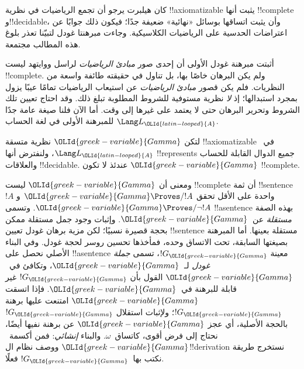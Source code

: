 \documentclass[../../../include/open-logic-section]{subfiles}
\begin{document}


كان هيلبرت يرجو أن تجمع الرياضيات في نظرية
!!{axiomatizable} يثبت أنها !!{complete} و!!{decidable}،
وأن يثبت اتساقها بوسائل «نهائية» ضعيفة جدًا؛ فيكون
ذلك جوابًا عن اعتراضات الحدسية على الرياضيات
الكلاسيكية. وجاءت مبرهنتا غودل لتبيّنا تعذر بلوغ
هذه المطالب مجتمعة.

أثبتت مبرهنة غودل الأولى أن إحدى صور
\emph{مبادئ الرياضيات} لراسل ووايتهد ليست
!!{complete}. ولم يكن البرهان خاصًا بها، بل
تناول في حقيقته طائفة واسعة من النظريات.
فلم يكن قصور \emph{مبادئ الرياضيات} عن استيعاب
الرياضيات تمامًا عيبًا يزول بمجرد استبدالها؛
إذ \emph{لا} نظرية مستوفية للشروط المطلوبة
تبلغ ذلك. وقد احتاج تعيين تلك الشروط وتحرير
البرهان حتى لا يعتمد على غيرها إلى وقت.
أما الآن فلنا صيغة عامة جدًا للمبرهنة الأولى
في لغة الحساب $\Lang L_\OLId{latin-looped}{A}$.

\begin{thm}
لتكن $\OLId{greek-variable}{Gamma}$ نظرية متسقة !!{axiomatizable}
في~$\Lang L_\OLId{latin-looped}{A}$، ولنفترض أنها !!{represents} جميع الدوال
القابلة للحساب والعلاقات !!{decidable}.
عندئذ لا تكون $\OLId{greek-variable}{Gamma}$ !!{complete}.
\end{thm}

ومعنى أن $\OLId{greek-variable}{Gamma}$ ليست !!{complete} أن ثمة
!!{sentence}~$!A$ واحدة على الأقل تحقق
$\OLId{greek-variable}{Gamma}\Proves/ !A$ و$\OLId{greek-variable}{Gamma}\Proves/\lnot !A$.
وتسمى !!a{sentence} بهذه الصفة \emph{مستقلة}
عن~$\OLId{greek-variable}{Gamma}$. وإثبات وجود جمل مستقلة ممكن
بحجة قصيرة نسبيًا؛ لكن مزية برهان غودل
تعيين !!{sentence} مستقلة بعينها. أما
المبرهنة بصيغتها السابقة، تحت الاتساق وحده،
فمأخذها تحسين روسر لحجة غودل. وفي البناء
الأصلي نحصل على !!a{sentence} معينة
$!G_\OLId{greek-variable}{Gamma}$، تسمى \emph{جملة غودل}
لـ~$\OLId{greek-variable}{Gamma}$، وتكافئ في~$\OLId{greek-variable}{Gamma}$ القول
بأن $!G_\OLId{greek-variable}{Gamma}$ غير قابلة للبرهنة في~$\OLId{greek-variable}{Gamma}$.
فإذا اتسقت $\OLId{greek-variable}{Gamma}$ امتنعت عليها برهنة
$!G_\OLId{greek-variable}{Gamma}$؛ ولإثبات استقلال $!G_\OLId{greek-variable}{Gamma}$
بالحجة الأصلية، أي عجز $\OLId{greek-variable}{Gamma}$ عن برهنة
نفيها أيضًا، نحتاج إلى فرض أقوى، كاتساق~$\omega$.
والبناء \emph{إنشائي}: فمن أكسمة~$\OLId{greek-variable}{Gamma}$
ووصف نظام ال!!{derivation} نستخرج طريقة
نكتب بها~$!G_\OLId{greek-variable}{Gamma}$ فعلًا.
\end{document}
